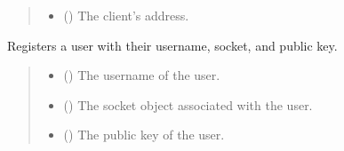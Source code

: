 \documentclass[letterpaper,10pt,english]{sphinxmanual}
\begin{document}
\begin{fulllineitems}
\begin{fulllineitems}
\begin{quote}
\begin{description}
\begin{itemize}
\item {} 
\sphinxAtStartPar
{} () \textendash{} The client’s address.

\end{itemize}

\end{description}\end{quote}

\end{fulllineitems}


\begin{fulllineitems}
\label{\detokenize{server1:server1.Server.register_user}}
\pysigstartsignatures
{}
\pysigstopsignatures
\sphinxAtStartPar
Registers a user with their username, socket, and public key.
\begin{quote}\begin{description}
\begin{itemize}
\item {} 
\sphinxAtStartPar
{} () \textendash{} The username of the user.

\item {} 
\sphinxAtStartPar
{} () \textendash{} The socket object associated with the user.

\item {} 
\sphinxAtStartPar
{} () \textendash{} The public key of the user.

\end{itemize}

\end{description}\end{quote}

\end{fulllineitems}



\end{fulllineitems}
\end{document}
